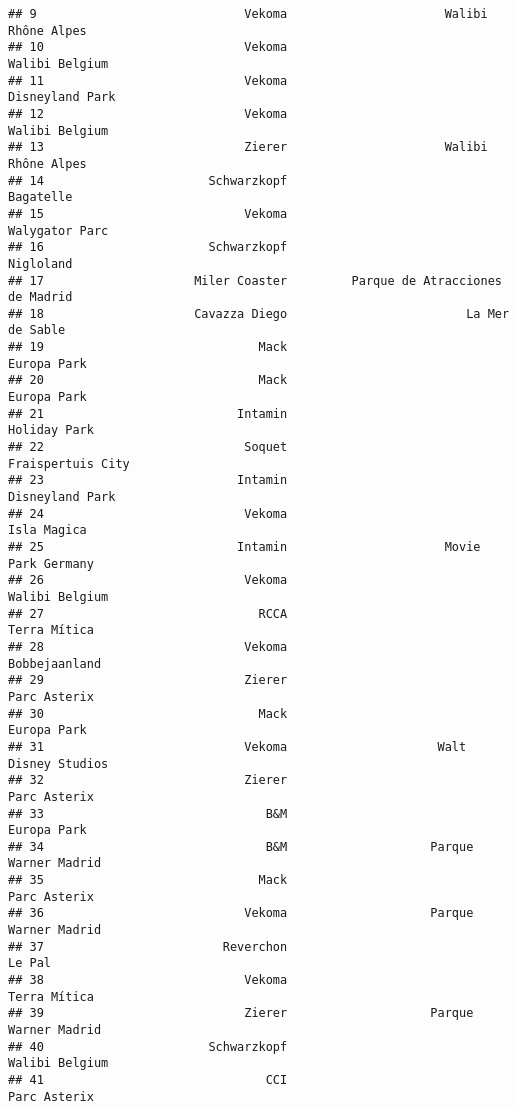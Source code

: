 \documentclass[
]{article}
\begin{document}
\begin{verbatim}
## 9                             Vekoma                      Walibi Rhône Alpes
## 10                            Vekoma                          Walibi Belgium
## 11                            Vekoma                         Disneyland Park
## 12                            Vekoma                          Walibi Belgium
## 13                            Zierer                      Walibi Rhône Alpes
## 14                       Schwarzkopf                               Bagatelle
## 15                            Vekoma                          Walygator Parc
## 16                       Schwarzkopf                               Nigloland
## 17                     Miler Coaster         Parque de Atracciones de Madrid
## 18                     Cavazza Diego                         La Mer de Sable
## 19                              Mack                             Europa Park
## 20                              Mack                             Europa Park
## 21                           Intamin                            Holiday Park
## 22                            Soquet                       Fraispertuis City
## 23                           Intamin                         Disneyland Park
## 24                            Vekoma                             Isla Magica
## 25                           Intamin                      Movie Park Germany
## 26                            Vekoma                          Walibi Belgium
## 27                              RCCA                            Terra Mítica
## 28                            Vekoma                           Bobbejaanland
## 29                            Zierer                            Parc Asterix
## 30                              Mack                             Europa Park
## 31                            Vekoma                     Walt Disney Studios
## 32                            Zierer                            Parc Asterix
## 33                               B&M                             Europa Park
## 34                               B&M                    Parque Warner Madrid
## 35                              Mack                            Parc Asterix
## 36                            Vekoma                    Parque Warner Madrid
## 37                         Reverchon                                  Le Pal
## 38                            Vekoma                            Terra Mítica
## 39                            Zierer                    Parque Warner Madrid
## 40                       Schwarzkopf                          Walibi Belgium
## 41                               CCI                            Parc Asterix

\end{verbatim}
\end{document}
